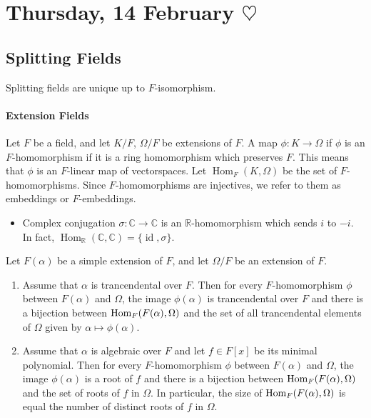 
\section{Thursday, 14 February \texorpdfstring{$\heartsuit$}{<3}}

\subsection{Splitting Fields}

Splitting fields are unique up to $F$-isomorphism.

\paragraph*{Extension Fields} Let $F$ be a field, and let $K/F$, $\Omega/F$ be extensions of $F$. A map $\phi\colon K\to \Omega$ if $\phi$ is an $F$-homomorphism if it is a ring homomorphism which preserves $F$. This means that $\phi$ is an $F$-linear map of vectorspaces. Let $\operatorname{Hom}_F(K, \Omega)$ be the set of $F$-homomorphisms. Since $F$-homomorphisms are injectives, we refer to them as embeddings or $F$-embeddings.

\begin{example} \leavevmode
\begin{itemize}
\item Complex conjugation $\sigma\colon \mathbb{C} \to \mathbb{C}$ is an $\mathbb{R}$-homomorphism which sends $i$ to $-i$. In fact, $\operatorname{Hom}_\mathbb{R}(\mathbb{C},\mathbb{C}) = \{\operatorname{id}, \sigma\}$.
\end{itemize}
\end{example}

\begin{theorem}
Let $F(\alpha)$ be a simple extension of $F$, and let $\Omega/F$ be an extension of $F$.
\begin{enumerate}[label={\textup{(\alph*)}}]
\item Assume that $\alpha$ is trancendental over $F$. Then for every $F$-homomorphism $\phi$ between $F(\alpha)$ and\/ $\Omega$, the image $\phi(\alpha)$ is trancendental over $F$ and there is a bijection between $\operatorname{Hom}_{F}(F(\alpha), \Omega)$ and the set of all trancendental elements of\/ $\Omega$ given by $\alpha \mapsto \phi(\alpha)$. 
\item Assume that $\alpha$ is algebraic over $F$ and let $f \in F[x]$ be its minimal polynomial. Then for every $F$-homomorphism $\phi$ between $F(\alpha)$ and\/ $\Omega$, the image $\phi(\alpha)$ is a root of $f$ and there is a bijection between $\operatorname{Hom}_F(F(\alpha), \Omega)$ and the set of roots of $f$ in $\Omega$. In particular, the size of\/ $\operatorname{Hom}_F(F(\alpha), \Omega)$ is equal the number of distinct roots of $f$ in $\Omega$.
\end{enumerate}
\end{theorem}

